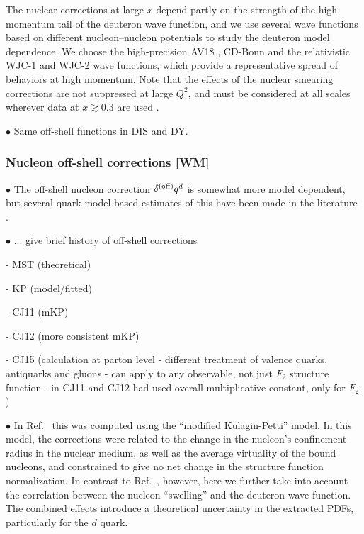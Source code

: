 \documentclass[aps,prd,amsmath,preprint]{revtex4}
\begin{document}
The nuclear corrections at large $x$ depend partly on the strength
of the high-momentum tail of the deuteron wave function, and we use
several wave functions based on different nucleon--nucleon potentials
to study the deuteron model dependence.  We choose the high-precision
AV18 \cite{AV18}, CD-Bonn \cite{CDBonn} and the relativistic WJC-1
and WJC-2 \cite{WJC} wave functions, which provide a representative
spread of behaviors at high momentum.
Note that the effects of the nuclear smearing corrections are not
suppressed at large $Q^2$, and must be considered at all scales
wherever data at $x \gtrsim 0.3$ are used \cite{CJ10, ACHL09, ARM12}.


$\bullet$
Same off-shell functions in DIS and DY.



\subsubsection{Nucleon off-shell corrections {\color{red} [WM]}}
\label{sssec:offshell}


$\bullet$
The off-shell nucleon correction $\delta^{(\rm off)} q^d$ is somewhat
more model dependent, but several quark model based estimates of this
have been made in the literature \cite{KP06, GL92, MSTplb}.


$\bullet$
... give brief history of off-shell corrections

- MST (theoretical)

- KP (model/fitted)

- CJ11 (mKP)

- CJ12 (more consistent mKP)

- CJ15 (calculation at parton level - different treatment of 
  valence quarks, antiquarks and gluons - can apply to any
  observable, not just $F_2$ structure function - in CJ11 and CJ12
  had used overall multiplicative constant, only for $F_2$)



$\bullet$
In Ref.~\cite{CJ11} this was computed using the ``modified Kulagin-Petti''
model.
In this model, the corrections were related to the change in the
nucleon's confinement radius in the nuclear medium, as well as the
average virtuality of the bound nucleons, and constrained to give no
net change in the structure function normalization.  In contrast to
Ref.~\cite{CJ11}, however, here we further take into account the
correlation between the nucleon ``swelling'' and the deuteron wave
function.  The combined effects introduce a theoretical uncertainty
in the extracted PDFs, particularly for the $d$ quark. 
\end{document}
